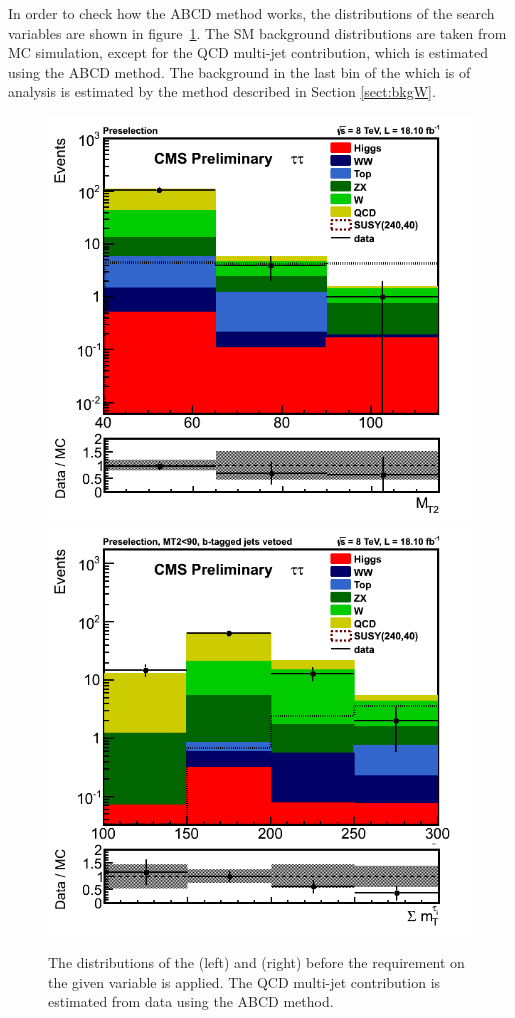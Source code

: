 In order to check how the ABCD method works, the distributions of the search variables are shown in 
figure~\ref{fig:5QCDbg}. The SM background distributions are taken from MC simulation, except for 
the QCD multi-jet contribution, which is estimated using the ABCD method. The \wjets background in the last bin of the \mttwo which is \binone of
analysis is estimated by the method described in Section \ref{sect:bkgW}.
\begin{figure}[iHhtb]
\centering
\includegraphics[angle=0,scale=0.375]{QCDbginTauTau/QCDWestimation_bin1.png}
\includegraphics[angle=0,scale=0.375]{QCDbginTauTau/QCDWestimation_bin2.png}
\caption{The distributions of the \mttwo (left) and \SumMT (right) before the requirement on the given variable
is applied. The QCD multi-jet contribution is estimated from data using the ABCD method.}
\label{fig:5QCDbg}
\end{figure}
